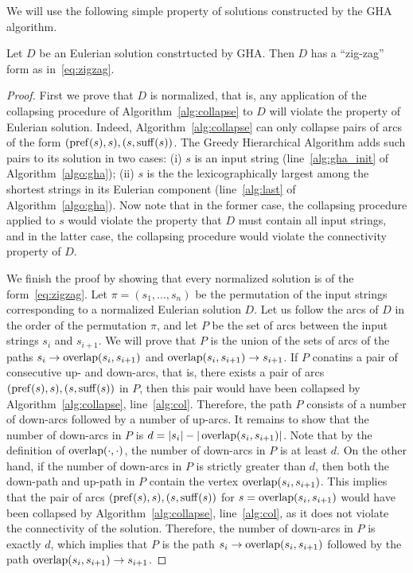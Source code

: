 We will use the following simple property of solutions constructed by the GHA algorithm.
\begin{claim}
\label{claim:zigzag}
Let $D$ be an Eulerian solution constrtucted by GHA. Then $D$ has a ``zig-zag'' form as in~\eqref{eq:zigzag}. 
\end{claim}
\begin{proof}
First we prove that $D$ is normalized, that is, any application of the collapsing procedure of Algorithm~\ref{alg:collapse} to $D$ will violate the property of Eulerian solution. Indeed, Algorithm~\ref{alg:collapse} can only collapse pairs of arcs of the form $(\operatorname{pref}(s), s), (s, \operatorname{suff}(s))$. The Greedy Hierarchical Algorithm adds such pairs to its solution in two cases: (i) $s$ is an input string (line~\ref{alg:gha_init} of Algorithm~\ref{algo:gha}); (ii) $s$ is the the lexicographically largest among the shortest strings in its Eulerian component (line~\ref{alg:last} of Algorithm~\ref{algo:gha}). Now note that in the former case, the collapsing procedure applied to $s$ would violate the property that $D$ must contain all input strings, and in the latter case, the collapsing procedure would violate the connectivity property of $D$.

We finish the proof by showing that every normalized solution is of the form~\eqref{eq:zigzag}. Let $\pi=(s_1, \dots, s_n)$ be  the permutation of the input strings corresponding to a normalized Eulerian solution $D$. Let us follow the arcs of $D$ in the order of the permutation $\pi$, and let $P$ be the set of arcs between the input strings $s_i$ and $s_{i+1}$. We will prove that $P$ is the union of the sets of arcs of the paths $s_i \to \operatorname{overlap}(s_i,s_{i+1})$ and $\operatorname{overlap}(s_i,s_{i+1})\to s_{i+1}$. If $P$ conatins a pair of consecutive up- and down-arcs, that is, there exists a pair of arcs $(\operatorname{pref}(s), s), (s, \operatorname{suff}(s))$ in $P$, then this pair would have been collapsed by Algorithm~\ref{alg:collapse}, line~\ref{alg:col}. Therefore, the path $P$ consists of a number of down-arcs followed by a number of up-arcs. It remains to show that the number of down-arcs in $P$ is $d=|s_i|-|\operatorname{overlap}(s_i,s_{i+1})|$. Note that by the definition of $\operatorname{overlap}(\cdot,\cdot)$, the number of down-arcs in $P$ is at least $d$. On the other hand, if the number of down-arcs in $P$ is strictly greater than $d$, then both the down-path and up-path in $P$ contain the vertex $\operatorname{overlap}(s_i, s_{i+1})$. This implies that the pair of arcs  $(\operatorname{pref}(s), s), (s, \operatorname{suff}(s))$ for $s=\operatorname{overlap}(s_i, s_{i+1})$ would have been collapsed by Algorithm~\ref{alg:collapse}, line~\ref{alg:col}, as it does not violate the connectivity of the solution. Therefore, the number of down-arcs in $P$ is exactly $d$, which implies that $P$ is the path $s_i \to \operatorname{overlap}(s_i,s_{i+1})$ followed by the path $\operatorname{overlap}(s_i,s_{i+1})\to s_{i+1}$.
\end{proof}

